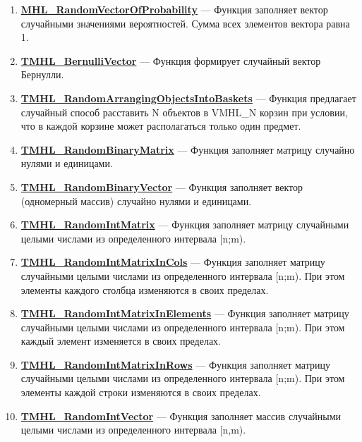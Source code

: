 \documentclass[a4paper,12pt]{article}
\begin{document}
\begin{enumerate}
\item \textbf{\hyperref[MHL_RandomVectorOfProbability]{MHL\_RandomVectorOfProbability}} --- Функция заполняет вектор случайными значениями вероятностей. Сумма всех элементов вектора равна 1.

\item \textbf{\hyperref[TMHL_BernulliVector]{TMHL\_BernulliVector}} --- Функция формирует случайный вектор Бернулли.

\item \textbf{\hyperref[TMHL_RandomArrangingObjectsIntoBaskets]{TMHL\_RandomArrangingObjectsIntoBaskets}} --- Функция предлагает случайный способ расставить N объектов в VMHL\_N корзин при условии, что в каждой корзине может располагаться только один предмет.

\item \textbf{\hyperref[TMHL_RandomBinaryMatrix]{TMHL\_RandomBinaryMatrix}} --- Функция заполняет матрицу случайно нулями и единицами.

\item \textbf{\hyperref[TMHL_RandomBinaryVector]{TMHL\_RandomBinaryVector}} --- Функция заполняет вектор (одномерный массив) случайно нулями и единицами.

\item \textbf{\hyperref[TMHL_RandomIntMatrix]{TMHL\_RandomIntMatrix}} --- Функция заполняет матрицу случайными целыми числами из определенного интервала [n;m).

\item \textbf{\hyperref[TMHL_RandomIntMatrixInCols]{TMHL\_RandomIntMatrixInCols}} --- Функция заполняет матрицу случайными целыми числами из определенного интервала [n;m). При этом элементы каждого столбца изменяются в своих пределах.

\item \textbf{\hyperref[TMHL_RandomIntMatrixInElements]{TMHL\_RandomIntMatrixInElements}} --- Функция заполняет матрицу случайными целыми числами из определенного интервала [n;m). При этом каждый элемент изменяется в своих пределах.

\item \textbf{\hyperref[TMHL_RandomIntMatrixInRows]{TMHL\_RandomIntMatrixInRows}} --- Функция заполняет матрицу случайными целыми числами из определенного интервала [n;m). При этом элементы каждой строки изменяются в своих пределах.

\item \textbf{\hyperref[TMHL_RandomIntVector]{TMHL\_RandomIntVector}} --- Функция заполняет массив случайными целыми числами из определенного интервала [n,m).


\end{enumerate}
\end{document}
